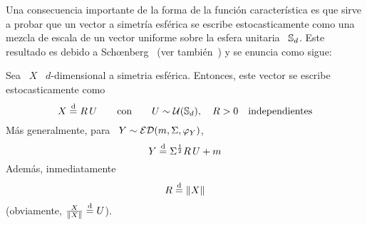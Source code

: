 Una consecuencia importante de la  forma de la funci\'on caracter\'istica es que
sirve a probar que un vector a simetr\'ia esf\'erica se escribe estocasticamente
como  una mezcla de  escala de  un vector  uniforme sobre  la esfera  unitaria \
$\mathbb{S}_d$. Este resultado es  debido a Sch{\oe}nberg~\cite{Sch38, FanKot90} (ver
tambi\'en~\cite{KeiSte74, Tei60}) y se enuncia como sigue:
%
\begin{teorema}
\label{Teo:MP:MezclaUniforme}
%
  Sea \ $X$  \ $d$-dimensional a simetria esf\'erica.   Entonces, este vector se
  escribe estocasticamente como
  \[
  X \stackrel{\mathrm{d}}{=} R \, U \qquad \mbox{con} \qquad U \sim \mathcal{U}(\mathbb{S}_d), \quad R > 0 \quad
  \mbox{independientes}
  \]
  M\'as generalmente, para \ $Y \sim \mathcal{ED}(m,\Sigma,\varphi_Y)$,
  \[
  Y \stackrel{\mathrm{d}}{=} \Sigma^{\frac12} R \, U + m
  \]
  Adem\'as, inmediatamente
  \[
  R \stackrel{\mathrm{d}}{=} \| X \|
  \]
  (obviamente, $\frac{X}{\| X \|} \stackrel{\mathrm{d}}{=} U$).
\end{teorema}
%
